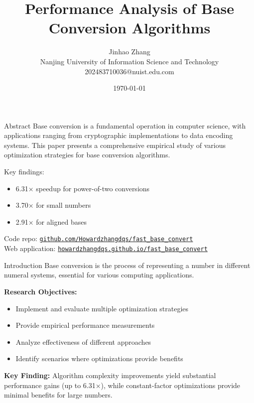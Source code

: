 \documentclass[10pt]{beamer}
\title{Performance Analysis of Base Conversion Algorithms}
\author{
  Jinhao Zhang \\
  Nanjing University of Information Science and Technology \\
  202483710036@nuist.edu.com
}
\date{\today}
\begin{document}
\maketitle

\begin{frame}{Abstract}
\small
Base conversion is a fundamental operation in computer science, with applications ranging from cryptographic implementations to data encoding systems. This paper presents a comprehensive empirical study of various optimization strategies for base conversion algorithms.

\vspace{0.2cm}
Key findings:
\begin{itemize}
\item 6.31× speedup for power-of-two conversions
\item 3.70× for small numbers
\item 2.91× for aligned bases
\end{itemize}

\vspace{0.2cm}
Code repo: \href{https://github.com/Howardzhangdqs/fast_base_convert}{\texttt{github.com/Howardzhangdqs/fast\_base\_convert}}\\
Web application: \href{https://howardzhangdqs.github.io/fast_base_convert/}{\texttt{howardzhangdqs.github.io/fast\_base\_convert}}
\end{frame}

\begin{frame}{Introduction}
Base conversion is the process of representing a number in different numeral systems, essential for various computing applications.

\vspace{0.3cm}
\textbf{Research Objectives:}
\begin{itemize}
\item Implement and evaluate multiple optimization strategies
\item Provide empirical performance measurements
\item Analyze effectiveness of different approaches
\item Identify scenarios where optimizations provide benefits
\end{itemize}

\vspace{0.3cm}
\textbf{Key Finding:} Algorithm complexity improvements yield substantial performance gains (up to 6.31×), while constant-factor optimizations provide minimal benefits for large numbers.
\end{frame}
\end{document}
